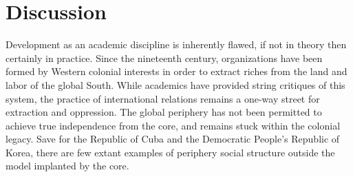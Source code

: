 \documentclass[american]{../../../coursework}
\begin{document}
\section{Discussion}

Development as an academic discipline is inherently flawed, if not in theory
then certainly in practice. Since the nineteenth century, organizations have
been formed by Western colonial interests in order to extract riches from the
land and labor of the global South. While academics have provided string
critiques of this system, the practice of international relations remains a
one-way street for extraction and oppression. The global periphery has not
been permitted to achieve true independence from the core, and remains stuck
within the colonial legacy. Save for the Republic of Cuba and the Democratic
People's Republic of Korea, there are few extant examples of periphery social
structure outside the model implanted by the core.

\printbibliography
\end{document}

